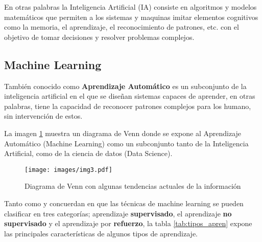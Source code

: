     En otras palabras la Inteligencia Artificial (IA) consiste en algoritmos y modelos matemáticos que permiten a los sistemas y maquinas imitar elementos cognitivos como la memoria, el aprendizaje, el reconocimiento de patrones, etc. con el objetivo de tomar decisiones y resolver problemas complejos.

    \subsection{Machine Learning}
    También conocido como \textbf{Aprendizaje Automático} es un subconjunto de la inteligencia artificial en el que se diseñan sistemas capaces de aprender, en otras palabras, tiene la capacidad de reconocer patrones complejos para los humano, sin intervención de estos.

    La imagen \ref{fig:diag_Venn} muestra un diagrama de Venn donde se expone al Aprendizaje Automático (Machine Learning) como un subconjunto tanto de la Inteligencia Artificial, como de la ciencia de datos (Data Science).

    \begin{figure}[!ht]
        \centering
        \texttt{[image: images/img3.pdf]}
        \caption{Diagrama de Venn con algunas tendencias actuales de la información}
        \label{fig:diag_Venn}
    \end{figure}
    

    Tanto \citep{bib4} como \citep{bib5} y \citep{bib11} concuerdan en que las técnicas de machine learning se pueden clasificar en  tres categorías; aprendizaje \textbf{supervisado}, el aprendizaje \textbf{no supervisado} y el aprendizaje por \textbf{refuerzo}, la tabla \ref{tab:tipos_apren}
    expone las principales características de algunos tipos de aprendizaje.



